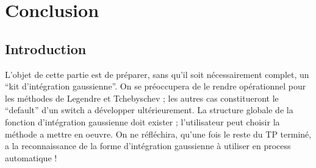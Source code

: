 \documentclass[a4paper,10pt]{report}
\begin{document}
\chapter*{Conclusion}

\section*{Introduction}

L'objet de cette partie est de préparer, sans qu'il soit nécessairement complet, un “kit d'intégration gaussienne”. On se préoccupera de le rendre opérationnel pour les méthodes de Legendre et Tchebyschev ; les autres cas constitueront le “default” d'un switch a développer ultérieurement.
La structure globale de la fonction d'intégration gaussienne doit exister ; l'utilisateur peut choisir  la méthode a mettre en oeuvre.
On ne réfléchira, qu'une fois le reste du TP terminé, a la reconnaissance de la forme d'intégration gaussienne à utiliser en process automatique !
\end{document}
